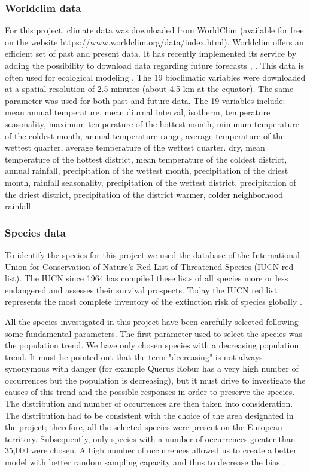 \documentclass[12pt,a4paper]{article}
\begin{document}
\subsubsection{Worldclim data}

For this project, climate data was downloaded from WorldClim (available for free on the website https://www.worldclim.org/data/index.html).
Worldclim offers an efficient set of past and present data. It has recently implemented its service by adding the possibility to download data regarding future forecasts \citep{wc}, \citep{ey}. This data is often used for ecological modeling \citep{bcw}. 
The 19 bioclimatic variables were downloaded at a spatial resolution of 2.5 minutes (about 4.5 km at the equator). The same parameter was used for both past and future data.
The 19 variables include: mean annual temperature, mean diurnal interval, isotherm, temperature seasonality, maximum temperature of the hottest month, minimum temperature of the coldest month, annual temperature range, average temperature of the wettest quarter, average temperature of the wettest quarter. dry, mean temperature of the hottest district, mean temperature of the coldest district, annual rainfall, precipitation of the wettest month, precipitation of the driest month, rainfall seasonality, precipitation of the wettest district, precipitation of the driest district, precipitation of the district warmer, colder neighborhood rainfall 

\subsubsection{Species data}
To identify the species for this project we used the database of the International Union for Conservation of Nature's Red List of Threatened Species (IUCN red list).
The IUCN since 1964 has compiled these lists of all species more or less endangered and assesses their survival prospects. Today the IUCN red list represents the most complete inventory of the extinction risk of species globally \citep {IUCN}.

All the species investigated in this project have been carefully selected following some fundamental parameters.
The first parameter used to select the species was the population trend. We have only chosen species with a decreasing population trend. It must be pointed out that the term "decreasing" is not always synonymous with danger (for example Querus Robur has a very high number of occurrences but the population is decreasing), but it must drive to investigate the causes of this trend and the possible responses in order to preserve the species.
The distribution and number of occurrences are then taken into consideration. The distribution had to be consistent with the choice of the area designated in the project; therefore, all the selected species were present on the European territory. Subsequently, only species with a number of occurrences greater than 35,000 were chosen. A high number of occurrences allowed us to create a better model with better random sampling capacity and thus to decrease the bias \citep {kaplan} .
\end{document}
